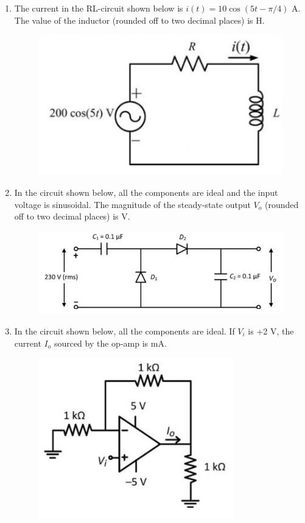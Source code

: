 \documentclass[a4paper, 11pt]{article}
\begin{document}
\begin{enumerate}
    \item The current in the RL-circuit shown below is $i(t)=10 \cos(5t-\pi/4)$ A. The value of the inductor (rounded off to two decimal places) is \underline{\hspace{2cm}} H.
    \begin{figure}[H]
        \centering
        \includegraphics[width=0.5\columnwidth]{figs/Q16.png}
        \caption*{}
        \label{fig:q26}
    \end{figure}

    \hfill{}

    \item In the circuit shown below, all the components are ideal and the input voltage is sinusoidal. The magnitude of the steady-state output $V_o$ (rounded off to two decimal places) is \underline{\hspace{2cm}} V.
    \begin{figure}[H]
        \centering
        \includegraphics[width=0.8\columnwidth]{figs/Q17.png}
        \caption*{}
        \label{fig:q27}
    \end{figure}

    \hfill{}

    \item In the circuit shown below, all the components are ideal. If $V_i$ is +2 V, the current $I_o$ sourced by the op-amp is \underline{\hspace{2cm}} mA.
    \begin{figure}[H]
        \centering
        \includegraphics[width=0.4\columnwidth]{figs/Q18.png}
        \caption*{}
        \label{fig:q28}
    \end{figure}


\end{enumerate}
\end{document}
